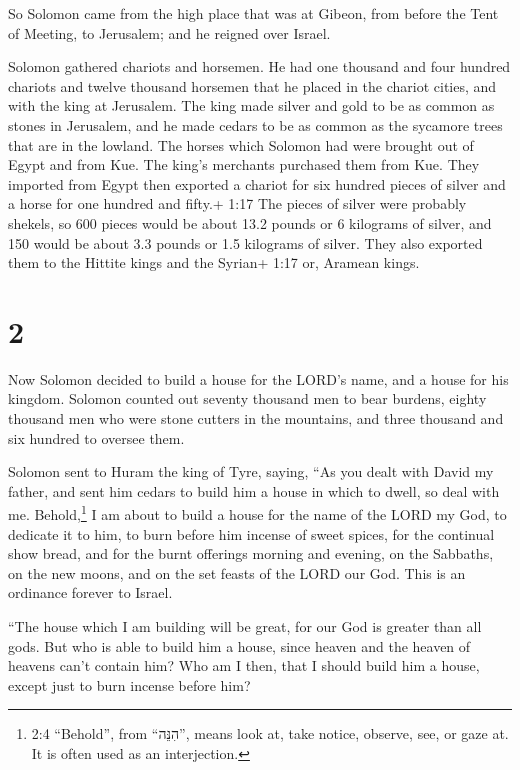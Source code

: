  So Solomon came from the high place that was at Gibeon,
from before the Tent of Meeting, to Jerusalem; and he reigned over
Israel.

 Solomon gathered chariots and horsemen. He had one
thousand and four hundred chariots and twelve thousand horsemen that he
placed in the chariot cities, and with the king at Jerusalem.
 The king made silver and gold to be as common as stones in
Jerusalem, and he made cedars to be as common as the sycamore trees that
are in the lowland.  The horses which Solomon had were
brought out of Egypt and from Kue. The king's merchants purchased them
from Kue.  They imported from Egypt then exported a chariot
for six hundred pieces of silver and a horse for one hundred and fifty.+
1:17 The pieces of silver were probably shekels, so 600 pieces would be
about 13.2 pounds or 6 kilograms of silver, and 150 would be about 3.3
pounds or 1.5 kilograms of silver. They also exported them to the
Hittite kings and the Syrian+ 1:17 or, Aramean kings.

\hypertarget{section-1}{%
\section{2}\label{section-1}}

 Now Solomon decided to build a house for the LORD's name,
and a house for his kingdom.  Solomon counted out seventy
thousand men to bear burdens, eighty thousand men who were stone cutters
in the mountains, and three thousand and six hundred to oversee them.

 Solomon sent to Huram the king of Tyre, saying, ``As you
dealt with David my father, and sent him cedars to build him a house in
which to dwell, so deal with me.  Behold,\footnote{2:4
  ``Behold'', from ``הִנֵּה'', means look at, take notice, observe, see,
  or gaze at. It is often used as an interjection.} I am about to build
a house for the name of the LORD my God, to dedicate it to him, to burn
before him incense of sweet spices, for the continual show bread, and
for the burnt offerings morning and evening, on the Sabbaths, on the new
moons, and on the set feasts of the LORD our God. This is an ordinance
forever to Israel.

 ``The house which I am building will be great, for our God
is greater than all gods.  But who is able to build him a
house, since heaven and the heaven of heavens can't contain him? Who am
I then, that I should build him a house, except just to burn incense
before him?

